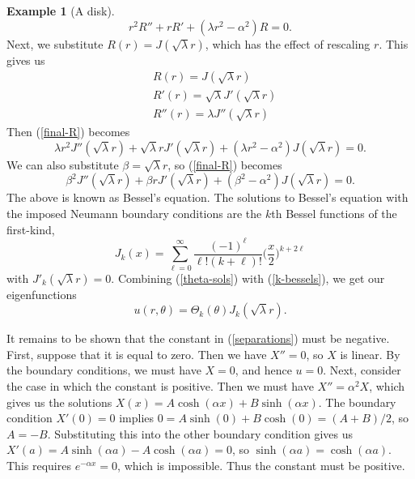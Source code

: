 \documentclass{article}
\numberwithin{equation}{section}
\theoremstyle{definition}
\newtheorem{exmp}[thm]{Example}
\begin{document}
\begin{exmp}[A disk]
\begin{equation}
    r^2R'' + rR' + (\lambda r^2 - \alpha^2)R = 0.
\end{equation}
Next, we substitute $R(r) = J(\sqrt{\lambda}r)$, which has the effect of rescaling $r$. This gives us
\begin{align}
    &R(r) = J(\sqrt{\lambda} r) \\
    &R'(r) = \sqrt{\lambda}J'(\sqrt{\lambda}r) \\
    &R''(r) = \lambda J''(\sqrt{\lambda}r)
\end{align}
Then (\ref{final-R}) becomes
\begin{equation}
    \lambda r^2 J''(\sqrt{\lambda}r) + \sqrt{\lambda}rJ'(\sqrt{\lambda}r) + (\lambda r^2 - \alpha^2)J(\sqrt{\lambda}r) = 0.
\end{equation}
We can also substitute $\beta = \sqrt{\lambda}r$, so (\ref{final-R}) becomes
\begin{equation}\label{bessels}
    \beta^2 J''(\sqrt{\lambda}r) + \beta rJ'(\sqrt{\lambda}r) + (\beta^2 - \alpha^2)J(\sqrt{\lambda}r) = 0.
\end{equation}
The above is known as Bessel's equation. The solutions to Bessel's equation with the imposed Neumann boundary conditions are the $k$th Bessel functions of the first-kind,
\begin{equation}\label{k-bessels}
    J_k(x) = \sum_{\ell=0}^\infty \frac{(-1)^\ell}{\ell!(k+\ell)!}\Big(\frac{x}{2}\Big)^{k+2\ell}
\end{equation}
with $J'_k(\sqrt{\lambda}r) = 0$. Combining (\ref{theta-sols}) with (\ref{k-bessels}), we get our eigenfunctions
\begin{equation}\label{disk-sols}
u(r,\theta) = \Theta_k(\theta)J_k(\sqrt{\lambda}r).
\end{equation}

It remains to be shown that the constant in (\ref{separations}) must be negative. First, suppose that it is equal to zero. Then we have $X'' = 0$, so $X$ is linear. By the boundary conditions, we must have $X = 0$, and hence $u = 0$. Next, consider the case in which the constant is positive. Then we must have $X'' = \alpha^2X$, which gives us the solutions $X(x) = A\cosh(\alpha x) + B\sinh(\alpha x)$. The boundary condition $X'(0) = 0$ implies $0 = A\sinh(0) + B\cosh(0) = (A + B)/2$, so $A = -B$. Substituting this into the other boundary condition gives us $X'(a) = A\sinh(\alpha a) - A\cosh(\alpha a) = 0$, so $\sinh(\alpha a) = \cosh(\alpha a)$. This requires $e^{-\alpha x} = 0$, which is impossible. Thus the constant must be positive.
\end{exmp}
\end{document}
